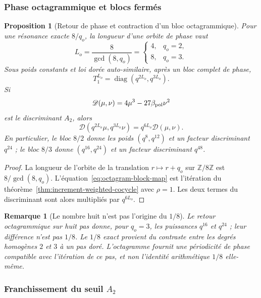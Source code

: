 \documentclass[11pt,a4paper]{article}
\newtheorem{proposition}[theorem]{Proposition}
\newtheorem{remark}[theorem]{Remarque}
\newcommand{\Z}{\mathbb Z}
\begin{document}
\subsubsection{Phase octagrammique et blocs fermés}

\begin{proposition}[Retour de phase et contraction d'un bloc octagrammique]\label{prop:octagram-block}
Pour une résonance exacte $8/q_o$, la longueur d'une orbite de phase vaut
\[
 L_o=\frac8{\gcd(8,q_o)}=
 \begin{cases}4,&q_o=2,\\8,&q_o=3.\end{cases}
\]
Sous poids constants et loi dorée auto-similaire, après un bloc complet de phase,
\begin{equation}\label{eq:octagram-block-map}
 T_1^{L_o}=\operatorname{diag}(q^{2L_o},q^{3L_o}).
\end{equation}
Si
\[
 \mathscr D(\mu,\nu)=4\mu^3-27\beta_{\rm pol}\nu^2
\]
est le discriminant $A_2$, alors
\begin{equation}\label{eq:A2-block-covariance}
 \boxed{\mathscr D(q^{2L_o}\mu,q^{3L_o}\nu)
 =q^{6L_o}\mathscr D(\mu,\nu).}
\end{equation}
En particulier, le bloc $8/2$ donne les poids $(q^8,q^{12})$ et un facteur discriminant $q^{24}$ ; le bloc $8/3$ donne $(q^{16},q^{24})$ et un facteur discriminant $q^{48}$.
\end{proposition}

\begin{proof}
La longueur de l'orbite de la translation $r\mapsto r+q_o$ sur $\Z/8\Z$ est $8/\gcd(8,q_o)$. L'équation~\eqref{eq:octagram-block-map} est l'itération du théorème~\ref{thm:increment-weighted-cocycle} avec $\rho=1$. Les deux termes du discriminant sont alors multipliés par $q^{6L_o}$.
\end{proof}

\begin{remark}[Le nombre huit n'est pas l'origine du $1/8$]
Le retour octagrammique sur huit pas donne, pour $q_o=3$, les puissances $q^{16}$ et $q^{24}$ ; leur différence n'est pas $1/8$. Le $1/8$ exact provient du contraste entre les degrés homogènes $2$ et $3$ à \emph{un pas doré}. L'octagramme fournit une périodicité de phase compatible avec l'itération de ce pas, et non l'identité arithmétique $1/8$ elle-même.
\end{remark}

\subsubsection{Franchissement du seuil $A_2$}
\end{document}
